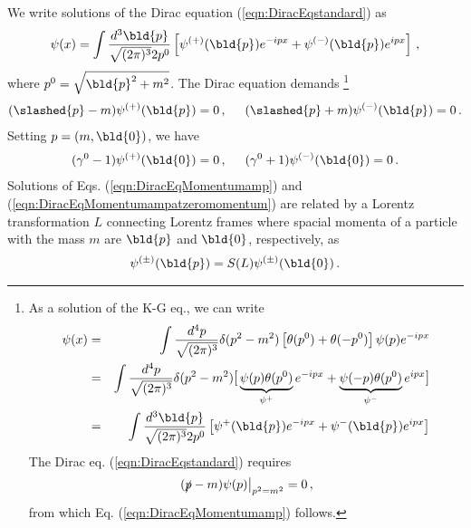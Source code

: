 We write solutions of the Dirac equation (\ref{eqn:DiracEqstandard}) as
\begin{eqnarray}
\psi(x) = \int \frac{d^3 \bld{p}}{\sqrt{(2\pi)^3} 2 p^0}
 \left[
\psi^{(+)}(\bld{p}) e^{-ipx} + \psi^{(-)}(\bld{p}) e^{ipx}
\right]\,,
\label{eqn:Diracfieldbypsipm}
\end{eqnarray}
where $p^0 = \sqrt{\bld{p}^2 + m^2}$.
The Dirac equation demands
\footnote{%
As  a solution of the K-G eq., we can write
\begin{eqnarray*}
\psi(x) &=& \int \frac{d^4 p}{\sqrt{(2\pi)^3}}
\delta(p^2 - m^2) 
 \left[
 \theta(p^0) +  \theta(-p^0) \right]
 \psi(p) e^{-ipx}
\\
&=&
\int \frac{d^4 p}{\sqrt{(2\pi)^3}}
\delta(p^2 - m^2)  
{\large \mbox{[}}
\underbrace{\psi(p)\theta(p^0)}_{\psi^{+}}  e^{-ipx} + 
\underbrace{\psi(-p)\theta(p^0)}_{\psi^{-}}  e^{ipx}
{\large \mbox{]}}
\\
&=&
\int \frac{d^3 \bld{p}}{\sqrt{(2\pi)^3}2p^0}
\left[
\psi^{+}(\bld{p})  e^{-ipx} + \psi^{-}(\bld{p})  e^{ipx}
\right]
\end{eqnarray*}
The Dirac eq. (\ref{eqn:DiracEqstandard}) requires
\begin{eqnarray*}
\left. (\slashed{p} - m) \psi(p) \right|_{p^2 = m^2} = 0\,,
\end{eqnarray*}
from which Eq. (\ref{eqn:DiracEqMomentumamp}) follows.
}%
\begin{eqnarray}
(\slashed{p} - m) \psi^{(+)}(\bld{p}) = 0\,,
\hspace{5mm}
(\slashed{p} + m) \psi^{(-)}(\bld{p}) = 0 \,.
\label{eqn:DiracEqMomentumamp}
\end{eqnarray}
Setting $p = (m, \bld{0})$, we have 
\begin{eqnarray}
(\gamma^0 - 1) \psi^{(+)}(\bld{0}) = 0\,,
\hspace{5mm}
(\gamma^0 + 1) \psi^{(-)}(\bld{0}) = 0 \,.
\label{eqn:DiracEqMomentumampatzeromomentum}
\end{eqnarray}
Solutions of Eqs. (\ref{eqn:DiracEqMomentumamp}) and
(\ref{eqn:DiracEqMomentumampatzeromomentum})
are related by a Lorentz transformation $L$
connecting Lorentz frames where
spacial momenta of a particle with the mass $m$ are
$\bld{p}$ and $\bld{0}$, respectively,
as
\begin{eqnarray}
\psi^{(\pm)}(\bld{p}) = S(L) \psi^{(\pm)}(\bld{0}) \,.
\end{eqnarray}

